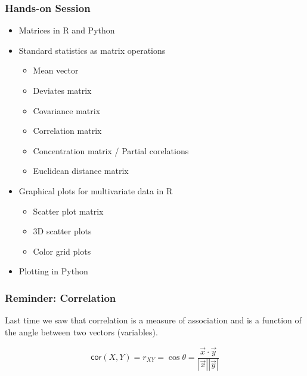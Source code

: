 \documentclass{beamer}
\begin{document}
\begin{frame}
  \frametitle{Hands-on Session}
		\begin{itemize}
    \item Matrices in R and Python		
		\item Standard statistics as matrix operations
\begin{itemize}
	\item Mean vector
	\item Deviates matrix
	\item Covariance matrix
	\item Correlation matrix
	\item Concentration matrix / Partial corelations
	\item Euclidean distance matrix		  
\end{itemize}
		  
		  \item Graphical plots for multivariate data in R
\begin{itemize}
		 \item Scatter plot matrix
         \item 3D scatter plots
         \item Color grid plots
\end{itemize}
        \item Plotting in Python

\end{itemize}

\end{frame}		

\begin{frame}
  \frametitle{Reminder: Correlation}

Last time we saw that correlation is a measure of association and is a function of the angle between two vectors (variables).

\begin{center}

\end{center}

\[
\mathsf{cor}(X,Y) = r_{XY} = \cos \theta = \frac{\vec{x} \cdot \vec{y}}{|\vec{x}||\vec{y}|}
\]


\end{frame}
\end{document}
